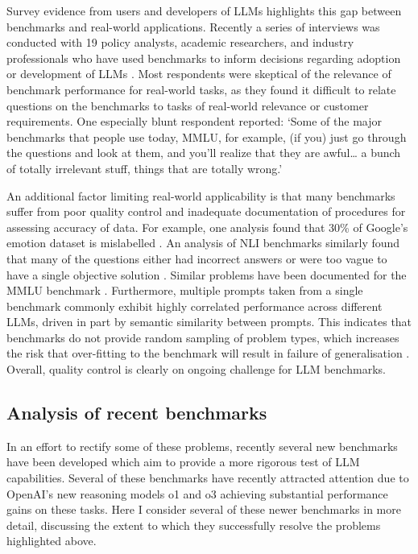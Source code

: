 \documentclass{article}
\begin{document}
Survey evidence from users and developers of LLMs highlights this gap between benchmarks and real-world applications. Recently a series of interviews was conducted with 19 policy analysts, academic researchers, and industry professionals who have used benchmarks to inform decisions regarding adoption or development of LLMs \citep{hardy2024more}. Most respondents were skeptical of the relevance of benchmark performance for real-world tasks, as they found it difficult to relate questions on the benchmarks to tasks of real-world relevance or customer requirements. One especially blunt respondent reported: ‘Some of the major benchmarks that people use today, MMLU, for example, (if you) just go through the questions and look at them, and you’ll realize that they are awful… a bunch of totally irrelevant stuﬀ, things that are totally wrong.’

An additional factor limiting real-world applicability is that many benchmarks suffer from poor quality control and inadequate documentation of procedures for assessing accuracy of data. For example, one analysis found that 30\% of Google’s emotion dataset is mislabelled \citep{chen2022}. An analysis of NLI benchmarks similarly found that many of the questions either had incorrect answers or were too vague to have a single objective solution \citep{Kalouli2023NLI}. Similar problems have been documented for the MMLU benchmark \citep{gema2024we}. Furthermore, multiple prompts taken from a single benchmark commonly exhibit highly correlated performance across different LLMs, driven in part by semantic similarity between prompts. This indicates that benchmarks do not provide random sampling of problem types, which increases the risk that over-fitting to the benchmark will result in failure of generalisation \citep{siska2024examining}. Overall, quality control is clearly on ongoing challenge for LLM benchmarks.

\subsection{Analysis of recent benchmarks}

In an effort to rectify some of these problems, recently several new benchmarks have been developed which aim to provide a more rigorous test of LLM capabilities. Several of these benchmarks have recently attracted attention due to OpenAI’s new reasoning models o1 and o3 achieving substantial performance gains on these tasks. Here I consider several of these newer benchmarks in more detail, discussing the extent to which they successfully resolve the problems highlighted above.
\end{document}
